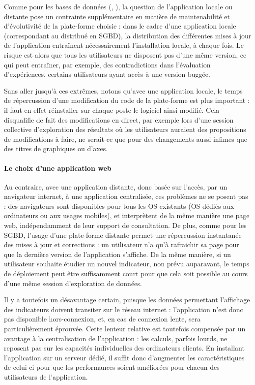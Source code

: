 Comme pour les bases de données (, ), la question de l'application locale ou distante pose un contrainte supplémentaire en matière de maintenabilité et d'évolutivité de la plate-forme choisie : dans le cadre d'une application locale (correspondant au distribué en SGBD), la distribution des différentes mises à jour de l'application entraînent nécessairement l'installation locale, à chaque fois.
Le risque est alors que tous les utilisateurs ne disposent pas d'une même version, ce qui peut entraîner, par exemple, des contradictions dans l'évaluation d'expériences, certains utilisateurs ayant accès à une version \og buggée\fg{}.

Sans aller jusqu'à ces extrêmes, notons qu'avec une application locale, le temps de répercussion d'une modification du code de la plate-forme est plus important : il faut en effet réinstaller sur chaque poste le logiciel ainsi modifié.
Cela disqualifie de fait des modifications \og en direct\fg{}, par exemple lors d'une session collective d'exploration des résultats où les utilisateurs auraient des propositions de modifications à faire, ne serait-ce que pour des changements aussi infimes que des titres de graphiques ou d'axes.

\paragraph*{Le choix d'une application web}

Au contraire, avec une application distante, donc basée sur l'accès, par un navigateur internet, à une application centralisée, ces problèmes ne se posent pas : des navigateurs sont disponibles pour tous les OS existants (OS dédiés aux ordinateurs ou aux usages mobiles), et interprètent de la même manière une page web, indépendamment de leur support de consultation.
De plus, comme pour les SGBD, l'usage d'une plate-forme distante permet une répercussion instantanée des mises à jour et corrections : un utilisateur n'a qu'à rafraichir sa page pour que la dernière version de l'application s'affiche.
De la même manière, si un utilisateur souhaite étudier un nouvel indicateur, non prévu auparavant, le temps de déploiement peut être suffisamment court pour que cela soit possible au cours d'une même session d'exploration de données.

Il y a toutefois un désavantage certain, puisque les données permettant l'affichage des indicateurs doivent transiter sur le réseau internet : l'application n'est donc pas disponible hors-connexion, et, en cas de connexion lente, sera particulièrement éprouvée.
Cette lenteur relative est toutefois compensée par un avantage à la centralisation de l'application : les calculs, parfois lourds, ne reposent pas sur les capacités individuelles des ordinateurs clients.
En installant l'application sur un serveur dédié, il suffit donc d'augmenter les caractéristiques de celui-ci pour que les performances soient améliorées pour chacun des utilisateurs de l'application.

